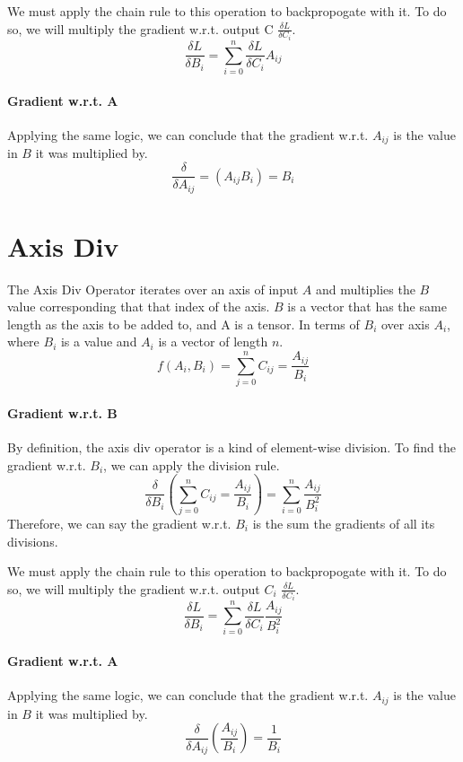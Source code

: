 \documentclass{report}
\begin{document}
            We must apply the chain rule to this operation to backpropogate with it. To do so, 
            we will multiply the gradient w.r.t. output C $\frac{\delta{L}}{\delta{C_i}}$. 
            $$\frac{\delta{L}}{\delta{B_i}} = \sum_{i=0}^{n} \frac{\delta{L}}{\delta{C_i}} A_{ij}$$

            \paragraph{Gradient w.r.t. A}
            Applying the same logic, we can conclude that the gradient w.r.t. $A_{ij}$ is the value in $B$ it was multiplied by.
            $$\frac{\delta}{\delta{A_{ij}}} = (A_{ij}B_i) = B_i$$

        \section{Axis Div}
            The Axis Div Operator iterates over an axis of input $A$ and multiplies the $B$ value corresponding that that index of the axis.
            $B$ is a vector that has the same length as the axis to be added to, and A is a tensor.
            In terms of $B_i$ over axis $A_i$, where $B_i$ is a value and $A_i$ is a vector of length $n$. 
            $$f(A_i, B_i) = \sum_{j=0}^{n} C_{ij} = \frac{A_{ij}}{B_i}$$

            \paragraph{Gradient w.r.t. B}
            By definition, the axis div operator is a kind of element-wise division. To find the gradient w.r.t. $B_i$, 
            we can apply the division rule.
            $$\frac{\delta}{\delta{B_i}}(\sum_{j=0}^{n} C_{ij} = \frac{A_{ij}}{B_i}) = \sum_{i=0}^{n} \frac{A_{ij}}{B_i^2}$$
            Therefore, we can say the gradient w.r.t. $B_i$ is the sum the gradients of all its divisions. 

            We must apply the chain rule to this operation to backpropogate with it. To do so, 
            we will multiply the gradient w.r.t. output $C_i$ $\frac{\delta{L}}{\delta{C_i}}$. 
            $$\frac{\delta{L}}{\delta{B_i}} = \sum_{i=0}^{n} \frac{\delta{L}}{\delta{C_i}} \frac{A_{ij}}{B_i^2}$$

            \paragraph{Gradient w.r.t. A}
            Applying the same logic, we can conclude that the gradient w.r.t. $A_{ij}$ is the value in $B$ it was multiplied by.
            $$\frac{\delta}{\delta{A_{ij}}}(\frac{A_{ij}}{B_i}) = \frac{1}{B_i}$$
\end{document}
